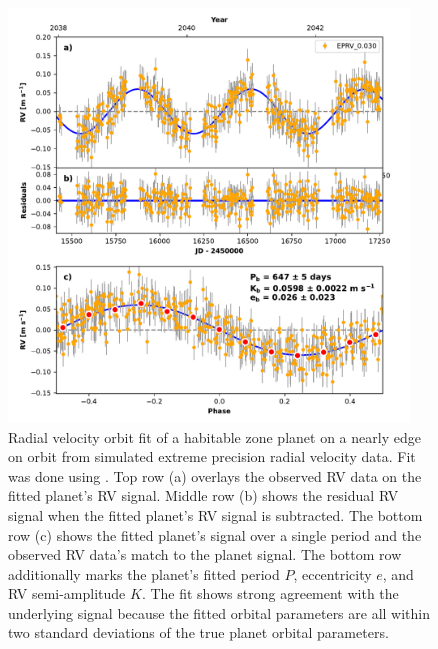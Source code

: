 \begin{figure}
  \begin{center}
    \includegraphics[width=0.95\textwidth]{ch3/figures/orbit_plot_mc_HIP_91438.pdf}
  \end{center}
  \caption{Radial velocity orbit fit of a habitable zone planet on a nearly edge on orbit from
  simulated extreme precision radial velocity data. Fit was done using
  \citep{rosenthalCaliforniaLegacy2021}. Top row
  (a) overlays the observed RV data on the fitted planet's RV signal. Middle
  row (b) shows the residual RV signal when the fitted planet's RV signal is
  subtracted. The bottom row (c) shows the fitted planet's signal over a single
  period and the observed RV data's match to the planet signal. The bottom row
  additionally marks the planet's fitted period $P$, eccentricity $e$, and RV
  semi-amplitude $K$. The fit shows strong agreement with the underlying signal
  because the fitted orbital parameters are all within two standard deviations of the true
  planet orbital parameters.}
  \label{fig:rv_fit}
\end{figure}

